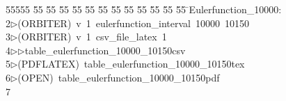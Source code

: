 %
%
\begin{tabbing}
55555 \= 55 \= 55 \= 55 \= 55 \= 55 \= 55 \= 55 \= 55 \= 55 \= 55 \= 55 \= 55 \= \>Eulerfunction\_10000:\\[0pt]
2\>$\triangleright$\>(ORBITER)\ v\ 1\ eulerfunction\_interval\ 10000\ 10150\\[0pt]
3\>$\triangleright$\>(ORBITER)\ v\ 1\ csv\_file\_latex\ 1\ \\[0pt]
4\>$\triangleright$\>$\triangleright$\>table\_eulerfunction\_10000\_10150csv\\[0pt]
5\>$\triangleright$\>(PDFLATEX)\ table\_eulerfunction\_10000\_10150tex\\[0pt]
6\>$\triangleright$\>(OPEN)\ table\_eulerfunction\_10000\_10150pdf\\[0pt]
7\>\end{tabbing}
